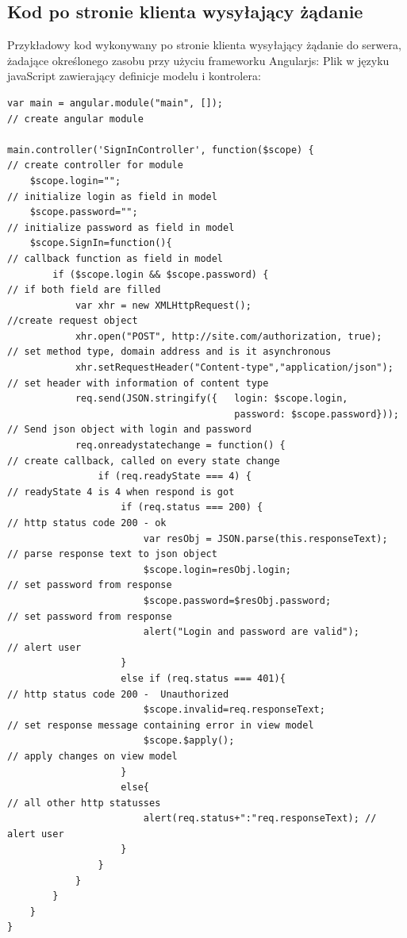 \documentclass[12pt]{report}
\begin{document}
\subsection{Kod po stronie klienta wysyłający żądanie}
Przykładowy kod wykonywany po stronie klienta wysyłający żądanie do serwera, żadające określonego zasobu przy użyciu frameworku Angularjs:
Plik w języku javaScript zawierający definicje modelu i kontrolera:
\medskip
\begin{lstlisting}
var main = angular.module("main", []); 									// create angular module

main.controller('SignInController', function($scope) { 					// create controller for module
	$scope.login=""; 													// initialize login as field in model
	$scope.password=""; 												// initialize password as field in model
	$scope.SignIn=function(){ 											// callback function as field in model
		if ($scope.login && $scope.password) {							// if both field are filled
			var xhr = new XMLHttpRequest();									//create request object
			xhr.open("POST", http://site.com/authorization, true);		// set method type, domain address and is it asynchronous
			xhr.setRequestHeader("Content-type","application/json");	// set header with information of content type
			req.send(JSON.stringify({	login: $scope.login,			
										password: $scope.password})); 	// Send json object with login and password
			req.onreadystatechange = function() { 						// create callback, called on every state change
				if (req.readyState === 4) { 							// readyState 4 is 4 when respond is got
					if (req.status === 200) { 							// http status code 200 - ok
						var resObj = JSON.parse(this.responseText);		// parse response text to json object
						$scope.login=resObj.login;						// set password from response
						$scope.password=$resObj.password;				// set password from response
						alert("Login and password are valid");			// alert user
					}
					else if (req.status === 401){						// http status code 200 -  Unauthorized
						$scope.invalid=req.responseText;  				// set response message containing error in view model
						$scope.$apply(); 								// apply changes on view model
					}
					else{ 												// all other http statusses
						alert(req.status+":"req.responseText); // alert user
					}
				}
			}
		}
	}
}
\end{lstlisting}
\end{document}
